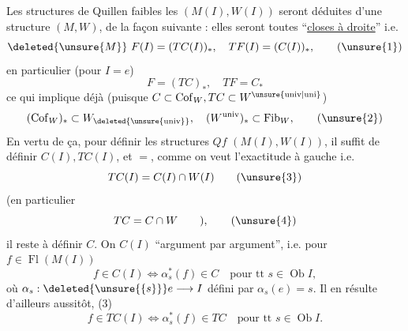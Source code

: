 \begingroup\makeatletter\tagsleft@true\makeatother
Les structures de Quillen faibles  les $(M(I),W(I))$ seront déduites d'une structure  $(M,W)$, de la façon suivante : elles seront toutes ``\uline{closes à droite}'' i.e.
\[
 \deleted{\unsure{M}}\ F(I)=(TC(I))_{*},\quad TF(I)=(C(I))_{*},\tag*{(\unsure{1})}
\]
\endgroup
en particulier (pour $I=e$)
\[
 F=(TC)_{*},\quad TF=C_{*}
\]
ce qui implique déjà (puisque $C\subset\operatorname{Cof}_{W},TC\subset W^{\unsure{\mathrm{univ}|\mathrm{uni}}}$)
\[
 (\operatorname{Cof}_{W})_{*}\subset W_{\deleted{\unsure{\mathrm{univ}}}},\quad(W^{\mathrm{univ}})_{*}\subset\operatorname{Fib}_{W},\tag*{(\unsure{2})}
\]
En vertu de ça, pour définir les structures $Qf$  $(M(I),W(I))$, il suffit de définir $C(I),TC(I)$, et $=$, comme on veut l'exactitude à gauche i.e.
\[
 TC(I)=C(I)\cap W(I)\tag*{(\unsure{3})}
\]
(en particulier
\[
 TC=C\cap W\qquad),\tag*{(\unsure{4})}
\]
il reste à définir $C$. On   $C(I)$ ``argument  par argument'', i.e. pour $f\in\operatorname{Fl}(M(I))$
\[
 f\in C(I)\Longleftrightarrow\alpha_{s}^{*}(f)\in C\quad\text{pour tt }s\in\operatorname{Ob}I,\tag*{(5)}
\]
où $\alpha_{s}:\deleted{\unsure{\{s\}}}e\longrightarrow I$ défini par $\alpha_{s}(e)=s$.
Il en résulte d'ailleurs aussitôt,  (3) 
\[
 f\in TC(I)\Longleftrightarrow\alpha_{s}^{*}(f)\in TC\quad\text{pour tt }s\in\operatorname{Ob}I.\tag*{(6)}
\]
